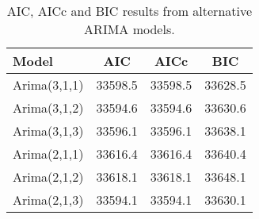 \begin{table}[ht]
\centering
\caption[AIC, AICc and BIC results from alternative ARIMA models]{AIC, AICc and BIC results from alternative ARIMA models.} 
\label{tab:chp_ts:arima_res_r}
\begin{tabular}{lccc}
  \toprule Model & AIC & AICc & BIC \\ 
  \midrule Arima(3,1,1) & 33598.5 & 33598.5 & 33628.5 \\ 
  Arima(3,1,2) & 33594.6 & 33594.6 & 33630.6 \\ 
  Arima(3,1,3) & 33596.1 & 33596.1 & 33638.1 \\ 
  Arima(2,1,1) & 33616.4 & 33616.4 & 33640.4 \\ 
  Arima(2,1,2) & 33618.1 & 33618.1 & 33648.1 \\ 
  Arima(2,1,3) & 33594.1 & 33594.1 & 33630.1 \\ 
   \bottomrule \end{tabular}
\end{table}
